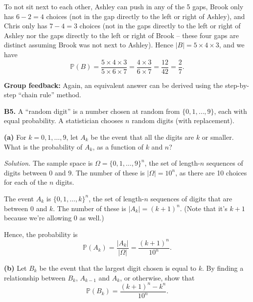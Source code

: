 \documentclass[
  a4paper,
]{book}
\theoremstyle{definition}
\theoremstyle{definition}
\theoremstyle{definition}
\theoremstyle{definition}
\theoremstyle{remark}
\begin{document}
\begin{myanswers}
To not sit next to each other, Ashley can push in any of the 5 gaps, Brook only has \(6 - 2 = 4\) choices (not in the gap directly to the left or right of Ashley), and Chris only has \(7 - 4 = 3\) choices (not in the gaps directly to the left or right of Ashley nor the gaps directly to the left or right of Brook -- these four gaps are distinct assuming Brook was not next to Ashley). Hence \(|B| = 5 \times 4 \times 3\), and we have
\[ \mathbb P(B) = \frac{5 \times 4 \times 3}{5 \times 6 \times 7} = \frac{4 \times 3}{6 \times 7} = \frac{12}{42} = \frac{2}{7}.  \]

\textbf{Group feedback:} Again, an equivalent answer can be derived using the step-by-step ``chain rule'' method.

\end{myanswers}

\textbf{B5.} A ``random digit'' is a number chosen at random from \(\{0, 1, \dots, 9\}\), each with equal probability. A statistician chooses \(n\) random digits (with replacement).

\textbf{(a)} For \(k = 0, 1, \dots, 9\), let \(A_k\) be the event that all the digits are \(k\) or smaller. What is the probability of \(A_k\), as a function of \(k\) and \(n\)?

\begin{myanswers}
\emph{Solution.}
The sample space is \(\Omega = \{0,1,\dots,9\}^n\), the set of length-\(n\) sequences of digits between \(0\) and \(9\). The number of these is \(|\Omega| = 10^n\), as there are 10 choices for each of the \(n\) digits.

The event \(A_k\) is \(\{0,1,\dots,k\}^n\), the set of length-\(n\) sequences of digits that are between \(0\) and \(k\). The number of these is \(|A_k| = (k+1)^n\). (Note that it's \(k+1\) because we're allowing 0 as well.)

Hence, the probability is
\[ \mathbb P(A_k) = \frac{|A_k|}{|\Omega|} = \frac{(k+1)^n}{10^n} . \]

\end{myanswers}

\textbf{(b)} Let \(B_k\) be the event that the largest digit chosen is equal to \(k\). By finding a relationship between \(B_k\), \(A_{k-1}\) and \(A_k\), or otherwise, show that
\[ \mathbb P(B_k) = \frac{(k+1)^n - k^n}{10^n} . \]
\end{document}
